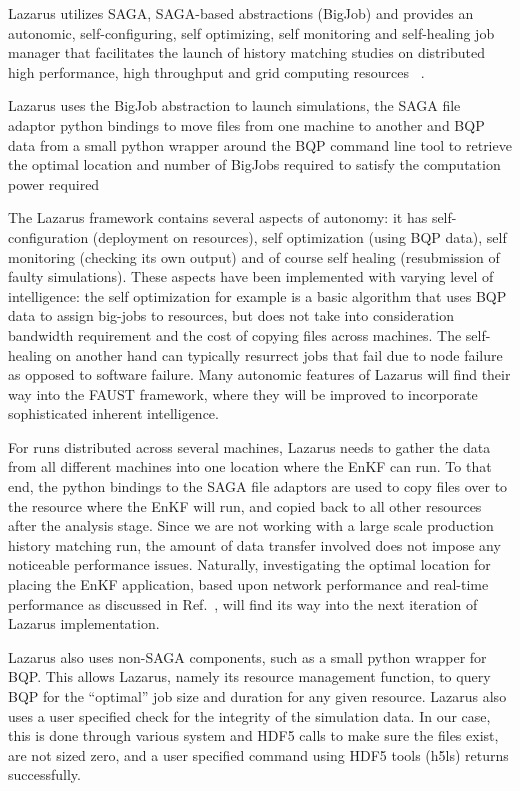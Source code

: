 \documentclass{rspublic}
\begin{document}
Lazarus utilizes SAGA, SAGA-based abstractions (BigJob) and provides
an autonomic, self-configuring, self optimizing, self monitoring and
self-healing job manager that facilitates the launch of history
matching studies on distributed high performance, high throughput and
grid computing resources ~\citep{gmac}.

Lazarus uses the BigJob abstraction to launch simulations,
the SAGA file adaptor python bindings to move files from one machine
to another and BQP data from a small python wrapper around the BQP
command line tool to retrieve the optimal location and number of
BigJobs required to satisfy the computation power required

The Lazarus framework contains several aspects of autonomy: it has
self-configuration (deployment on resources), self optimization (using
BQP data), self monitoring (checking its own output) and of course
self healing (resubmission of faulty simulations). These aspects have
been implemented with varying level of intelligence: the self
optimization for example is a basic algorithm that uses BQP data to
assign big-jobs to resources, but does not take into consideration
bandwidth requirement and the cost of copying files across
machines. The self-healing on another hand can typically resurrect
jobs that fail due to node failure as opposed to software
failure. Many autonomic features of Lazarus will find their way into
the FAUST framework, where they will be improved to incorporate
sophisticated inherent intelligence.  

For runs distributed across several machines, Lazarus needs to gather
the data from all different machines into one location where the EnKF
can run. To that end, the python bindings to the SAGA file adaptors
are used to copy files over to the resource where the EnKF will run,
and copied back to all other resources after the analysis stage. Since
we are not working with a large scale production history matching run,
the amount of data transfer involved does not impose any noticeable
performance issues. Naturally, investigating the optimal location for
placing the EnKF application, based upon network performance and
real-time performance as discussed in Ref.~\cite{escience07}, will
find its way into the next iteration of Lazarus implementation.

Lazarus also uses non-SAGA components, such as a small python wrapper
for BQP. This allows Lazarus, namely its resource management function,
to query BQP for the ``optimal'' job size and duration for any given
resource. Lazarus also uses a user specified check for the integrity
of the simulation data. In our case, this is done through various
system and HDF5 calls to make sure the files exist, are not sized
zero, and a user specified command using HDF5 tools (h5ls) returns
successfully.
\end{document}
